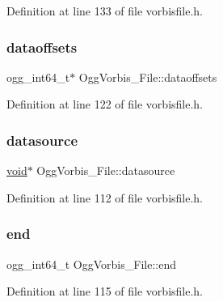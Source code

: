 Definition at line 133 of file vorbisfile.\+h.

\mbox{\label{struct_ogg_vorbis___file_af797824fb6e98c0248c19e6909dd680e}} 
\subsubsection{\texorpdfstring{dataoffsets}{dataoffsets}}
{\footnotesize\ttfamily ogg\+\_\+int64\+\_\+t$\ast$ Ogg\+Vorbis\+\_\+\+File\+::dataoffsets}



Definition at line 122 of file vorbisfile.\+h.

\mbox{\label{struct_ogg_vorbis___file_a46afb3dcc7aac5917573e41d7504c0d6}} 
\subsubsection{\texorpdfstring{datasource}{datasource}}
{\footnotesize\ttfamily \mbox{\hyperlink{_s_d_l__opengles2__gl2ext_8h_ae5d8fa23ad07c48bb609509eae494c95}{void}}$\ast$ Ogg\+Vorbis\+\_\+\+File\+::datasource}



Definition at line 112 of file vorbisfile.\+h.

\mbox{\label{struct_ogg_vorbis___file_ae56eb8bc78d2fc27c79d145a7c80a681}} 
\subsubsection{\texorpdfstring{end}{end}}
{\footnotesize\ttfamily ogg\+\_\+int64\+\_\+t Ogg\+Vorbis\+\_\+\+File\+::end}



Definition at line 115 of file vorbisfile.\+h.

\mbox{\label{struct_ogg_vorbis___file_ad41f80ffaa6b48a14addef0a02639a87}} 
